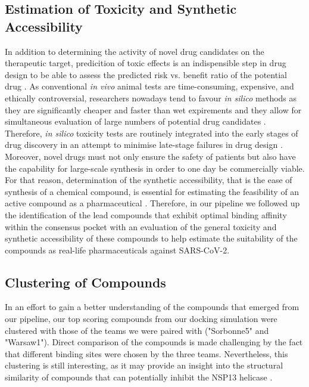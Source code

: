 \documentclass[11pt, letterpaper, titlepage]{article}
\renewcommand{\cite}{\parencite}
\begin{document}
\subsection{Estimation of Toxicity and Synthetic Accessibility}
In addition to determining the activity of novel drug candidates on the therapeutic target, predicition of toxic effects is an indispensible step in drug design to be able to assess the predicted risk vs. benefit ratio of the potential drug \cite{roncaglioni2013silico}. As conventional \textit{in vivo} animal tests are time-consuming, expensive, and ethically controversial, researchers nowadays tend to favour \textit{in silico} methods as they are significantly cheaper and faster than wet expirements and they allow for simultaneous evaluation of large numbers of potential drug candidates \cite{raies2016silico,roncaglioni2013silico}. Therefore, \textit{in silico} toxicity tests are routinely integrated into the early stages of drug discovery in an attempt to minimise late-stage failures in drug design \cite{dearden2003silico}. Moreover, novel drugs must not only ensure the safety of patients but also have the capability for large-scale synthesis in order to one day be commercially viable. For that reason, determination of the synthetic accessibility, that is the ease of synthesis of a chemical compound, is essential for estimating the feasibility of an active compound as a pharmaceutical \cite{boda2007structure}. Therefore, in our pipeline we followed up the identification of the lead compounds that exhibit optimal binding affinity within the consensus pocket with an evaluation of the general toxicity and synthetic accessibility of these compounds to help estimate the suitability of the compounds as real-life pharmaceuticals against \ac{SARS-CoV-2}.

\subsection{Clustering of Compounds}
In an effort to gain a better understanding of the compounds that emerged from our pipeline, our top scoring compounds from our docking simulation were clustered with those of the teams we were paired with ("Sorbonne5" and "Warsaw1"). Direct comparison of the compounds is made challenging by the fact that different binding sites were chosen by the three teams. Nevertheless, this clustering is still interesting, as it may provide an insight into the structural similarity of compounds that can potentially inhibit the \ac{NSP13} helicase \cite{Spratt_2021}.
\end{document}
